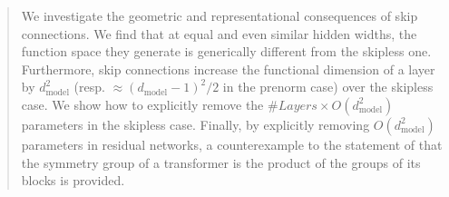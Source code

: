 \documentclass[10pt]{article}
\theoremstyle{definition}
\theoremstyle{remark}
\newcommand{\dm}{d_{\mathrm{model}}}
\begin{document}
\begin{abstract}
\noindent We investigate the geometric and representational consequences of skip connections. We find that at equal and even similar hidden widths, the function space they generate is generically different from the skipless one. Furthermore, skip connections increase the functional dimension of a layer by $\dm^2$ (resp. $\approx(\dm-1)^2/2$ in the prenorm case) over the skipless case. We show how to explicitly remove the $\#Layers \times O(\dm^2)$ parameters in the skipless case. Finally, by explicitly removing $O(\dm^2)$ parameters in residual networks, a counterexample to the statement of \citet{wang2025gauge} that the symmetry group of a transformer is the product of the groups of its blocks is provided.



\end{abstract}
\end{document}
